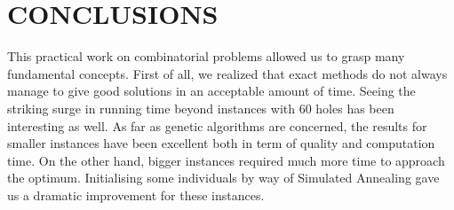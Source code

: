 \documentclass[letterpaper, 10 pt, conference]{ieeeconf}  %
\begin{document}
\section{CONCLUSIONS}
This practical work on combinatorial problems allowed us to grasp many fundamental concepts. First of all, we realized that exact methods do not always manage to give good solutions in an acceptable amount of time. Seeing the striking surge in running time beyond instances with 60 holes has been interesting as well. \newline 
As far as genetic algorithms are concerned, the results for smaller instances have been excellent both in term of quality and computation time. On the other hand, bigger instances required much more time to approach the optimum. Initialising some individuals by way of Simulated Annealing gave us a dramatic improvement for these instances. 


\addtolength{\textheight}{-12cm}   %







\end{document}

